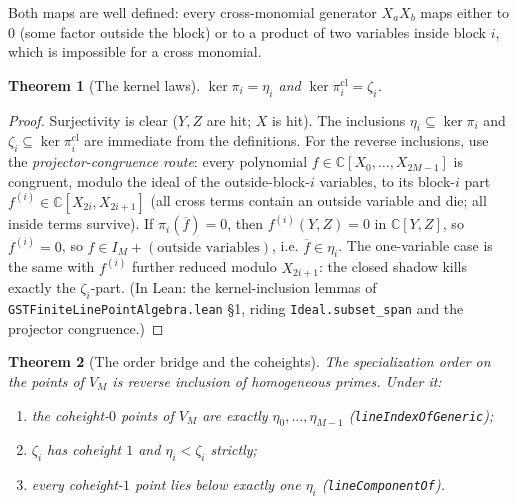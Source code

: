 \documentclass[11pt,a4paper]{article}
\theoremstyle{plain}
\newtheorem{theorem}{Theorem}[section]
\theoremstyle{definition}
\newcommand{\C}{\mathbb{C}}
\begin{document}
Both maps are well defined: every cross-monomial generator $X_aX_b$
maps either to $0$ (some factor outside the block) or to a product of
two variables inside block $i$, which is impossible for a cross
monomial.

\begin{theorem}[The kernel laws]\label{thm:kernel}
$\ker \pi_i = \eta_i$ and $\ker \pi_i^{\mathrm{cl}} = \zeta_i$.
\end{theorem}

\begin{proof}
Surjectivity is clear ($Y, Z$ are hit; $X$ is hit).  The inclusions
$\eta_i \subseteq \ker\pi_i$ and $\zeta_i \subseteq \ker
\pi_i^{\mathrm{cl}}$ are immediate from the definitions.  For the
reverse inclusions, use the \emph{projector-congruence route}: every
polynomial $f \in \C[X_0,\dots,X_{2M-1}]$ is congruent, modulo the
ideal of the outside-block-$i$ variables, to its block-$i$ part
$f^{(i)} \in \C[X_{2i},X_{2i+1}]$ (all cross terms contain an outside
variable and die; all inside terms survive).  If
$\pi_i(\overline f) = 0$, then $f^{(i)}(Y,Z) = 0$ in $\C[Y,Z]$, so
$f^{(i)} = 0$, so $f \in I_M + (\text{outside variables})$, i.e.
$\overline f \in \eta_i$.  The one-variable case is the same with
$f^{(i)}$ further reduced modulo $X_{2i+1}$: the closed shadow kills
exactly the $\zeta_i$-part.  (In Lean: the kernel-inclusion lemmas of
\texttt{GSTFiniteLinePointAlgebra.lean} \S1, riding
\texttt{Ideal.subset\_span} and the projector congruence.)
\end{proof}

\begin{theorem}[The order bridge and the coheights]\label{thm:coheight}
The specialization order on the points of $V_M$ is reverse inclusion of
homogeneous primes.  Under it:
\begin{enumerate}
\item the coheight-$0$ points of $V_M$ are exactly $\eta_0, \dots,
\eta_{M-1}$ (\texttt{lineIndexOfGeneric});
\item $\zeta_i$ has coheight $1$ and $\eta_i < \zeta_i$ strictly;
\item every coheight-$1$ point lies below exactly one $\eta_i$
(\texttt{lineComponentOf}).
\end{enumerate}
\end{theorem}
\end{document}
